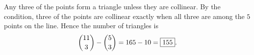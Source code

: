 Any three of the points form a triangle unless they are collinear. By the condition, three of the points are collinear exactly when all three are among the $5$ points on the line. Hence the number of triangles is
\[\dbinom{11}{3}-\dbinom{5}{3}=165-10=\boxed{155}.\]

